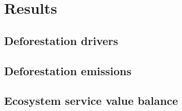 \section{Results}
\label{sec:result}
\subsection{Deforestation drivers}
\subsection{Deforestation emissions}
\subsection{Ecosystem service value balance}
